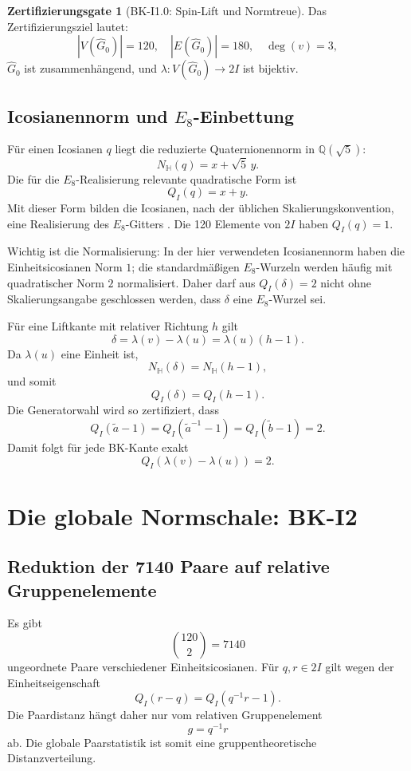 \documentclass[11pt,a4paper]{article}
\theoremstyle{definition}
\newtheorem{gate}[satz]{Zertifizierungsgate}
\newcommand{\twoI}{2I}
\newcommand{\QI}{Q_I}
\begin{document}
\begin{gate}[BK-I1.0: Spin-Lift und Normtreue]
Das Zertifizierungsziel lautet:
\[
|V(\widehat G_0)|=120,\quad
|E(\widehat G_0)|=180,\quad
\deg(v)=3,
\]
\(\widehat G_0\) ist zusammenhängend, und
\(\lambda:V(\widehat G_0)\to\twoI\) ist bijektiv.
\end{gate}

\subsection{Icosianennorm und \(E_8\)-Einbettung}

Für einen Icosianen \(q\) liegt die reduzierte Quaternionennorm in
\(\mathbb Q(\sqrt5)\):
\[
N_{\mathbb H}(q)=x+\sqrt5\,y.
\]
Die für die \(E_8\)-Realisierung relevante quadratische Form ist
\[
\QI(q)=x+y.
\]
Mit dieser Form bilden die Icosianen, nach der üblichen Skalierungskonvention, eine Realisierung des \(E_8\)-Gitters \cite{Baez2018}. Die 120 Elemente von \(\twoI\) haben \(\QI(q)=1\).

Wichtig ist die Normalisierung: In der hier verwendeten Icosianennorm haben die Einheitsicosianen Norm \(1\); die standardmäßigen \(E_8\)-Wurzeln werden häufig mit quadratischer Norm \(2\) normalisiert. Daher darf aus \(\QI(\delta)=2\) nicht ohne Skalierungsangabe geschlossen werden, dass \(\delta\) eine \(E_8\)-Wurzel sei.

Für eine Liftkante mit relativer Richtung \(h\) gilt
\[
\delta=\lambda(v)-\lambda(u)=\lambda(u)(h-1).
\]
Da \(\lambda(u)\) eine Einheit ist,
\[
N_{\mathbb H}(\delta)=N_{\mathbb H}(h-1),
\]
und somit
\[
\QI(\delta)=\QI(h-1).
\]
Die Generatorwahl wird so zertifiziert, dass
\[
\QI(\tilde a-1)=\QI(\tilde a^{-1}-1)
=\QI(\tilde b-1)=2.
\]
Damit folgt für jede BK-Kante exakt
\[
\boxed{\QI(\lambda(v)-\lambda(u))=2.}
\]

\section{Die globale Normschale: BK-I2}

\subsection{Reduktion der 7140 Paare auf relative Gruppenelemente}

Es gibt
\[
\binom{120}{2}=7140
\]
ungeordnete Paare verschiedener Einheitsicosianen. Für \(q,r\in\twoI\) gilt wegen der Einheitseigenschaft
\[
\QI(r-q)=\QI(q^{-1}r-1).
\]
Die Paardistanz hängt daher nur vom relativen Gruppenelement
\[
g=q^{-1}r
\]
ab. Die globale Paarstatistik ist somit eine gruppentheoretische Distanzverteilung.
\end{document}
